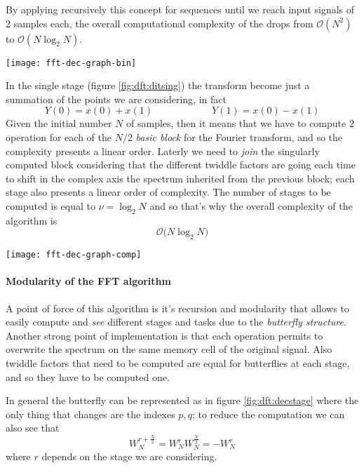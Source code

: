 	
	By applying recursively this concept for sequences until we reach input signals of 2 samples each, the overall computational complexity of the \dft  drops from $\mathcal O(N^2)$ to $\mathcal O(N\log_2N)$.
	\begin{SCfigure}[2][bht]
		\centering \texttt{[image: fft-dec-graph-bin]}
		\caption{graph representation of the \fft using the decimation in time algorithm computed on 2 points.} \label{fig:dft:ditsing}
	\end{SCfigure}
	
	In the single stage (figure \ref{fig:dft:ditsing}) the transform become just a summation of the points we are considering, in fact
	\[ Y(0) = x(0) + x(1) \qquad \qquad \qquad Y(1) = x(0)-x(1) \]	
	Given the initial number $N$ of samples, then it means that we have to compute $2$ operation for each of the $N/2$ \textit{basic block} for the Fourier transform, and so the complexity presents a linear order. Laterly we need to \textit{join} the singularly computed block considering that the different twiddle factors are going each time to shift in the complex axis the spectrum inherited from the previous block; each stage also presents a linear order of complexity. The number of stages to be computed is equal to $\nu = \log_2N$ and so that's why the overall complexity of the algorithm is
	\[ \mathcal O\big(N\log_2 N \big) \]
	
	
	\begin{SCfigure}[2][bht]
		\centering \texttt{[image: fft-dec-graph-comp]}
		\caption{complete graph representing the computation to do with the decimation in time algorithm for $N=8$ samples. The transform of 2 value is shown in figure \ref{fig:dft:ditsing}.}
	\end{SCfigure}
	
	\paragraph{Modularity of the FFT algorithm} A point of force of this algorithm is it's recursion and modularity that allows to easily compute and \textit{see} different stages and tasks due to the \textit{butterfly structure}. Another strong point of implementation is that each operation permits to overwrite the spectrum on the same memory cell of the original signal. Also twiddle factors that need to be computed are equal for butterflies at each stage, and so they have to be computed one.
	
	In general the butterfly can be represented as in figure \ref{fig:dft:decstage} where the only thing that changes are the indexes $p,q$; to reduce the computation we can also see that 
	\[ W_N^{r + \frac{N}{2}} = W_N^r W_N^{\frac N 2}  = - W_N^r \]
	where $r$ depends on the stage we are considering.
	
